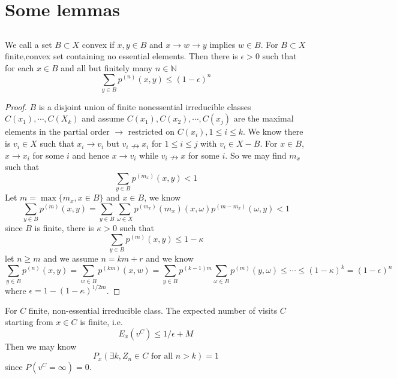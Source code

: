 \documentclass[lang=en,11pt,a4paper,citestyle =authoryear]{elegantpaper}
\newcommand{\N}{\mathbb{N}}
\begin{document}
\newpage

\appendix

\section{Some lemmas}

\subsection{}
\begin{lemma}
    We call a set $B\subset X$ convex if $x,y \in B$ and $x\to w\to y$ implies $w\in B$. For $B\subset X$ finite,convex set containing no essential elements. Then there is $\epsilon > 0$ such that for each $x\in B$ and all but finitely many $n\in \N$
    \[
    \sum\limits_{y\in B}p^{(n)}(x,y) \leq (1-\epsilon)^n
    \]
\end{lemma}
\begin{proof}
    $B$ is a disjoint union of finite nonessential irreducible classes $C(x_1),\cdots,C(X_k)$ and assume $C(x_1),C(x_2),\cdots,C(x_j)$ are the maximal elements in the partial order $\to$ restricted on $C(x_i), 1\leq i\leq k$. We know there is $v_i \in X$ such that $x_i \to v_i$ but $v_i \nrightarrow x_i$ for $1\leq i \leq j$ with $v_i \in X - B$. For $x\in B$, $x\to x_i$ for some $i$ and hence $x\to v_i$ while $v_i \nrightarrow x$ for some $i$. So we may find $m_x$ such that
    \[\sum_{y\in B} p^{(m_x)}(x,y) < 1\]
    Let $ m = \max\{m_x, x\in B\}$ and $x\in B$, we know
    \[
    \sum\limits_{y\in B}p^{(m)}(x,y) = \sum\limits_{y\in B}\sum\limits_{\omega \in X}p^{(m_x)}(m_x)(x,\omega)p^{(m-m_x)}(\omega,y) < 1
    \]
    since $B$ is finite, there is $\kappa > 0$ such that
    \[
    \sum_{y\in B}p^{(m)}(x,y) \leq 1-\kappa
    \]
    let $n \geq m$ and we assume $n = km +r$ and we know
    \[
    \sum\limits_{y\in B}p^{(n)}(x,y) = \sum\limits_{w\in B}p^{(km)}(x,w) = \sum\limits_{y\in B}p^{(k-1)m}\sum\limits_{\omega \in B}p^{(m)}(y,\omega) \leq \cdots \leq (1-\kappa)^k = (1-\epsilon)^n
    \]
    where $\epsilon = 1 - (1-\kappa)^{1/2m}$.
\end{proof}


\begin{lemma}
    For $C$ finite, non-essential irreducible class. The expected number of visits $C$ starting from $x\in C$ is finite, i.e.
    \[
    E_x(v^C) \leq 1/\epsilon +M
    \]
    Then we may know
    \[P_x(\exists k, Z_n \in C\text{ for all }n>k) = 1\]
    since $P(v^C = \infty) = 0$.
\end{lemma}
\end{document}
